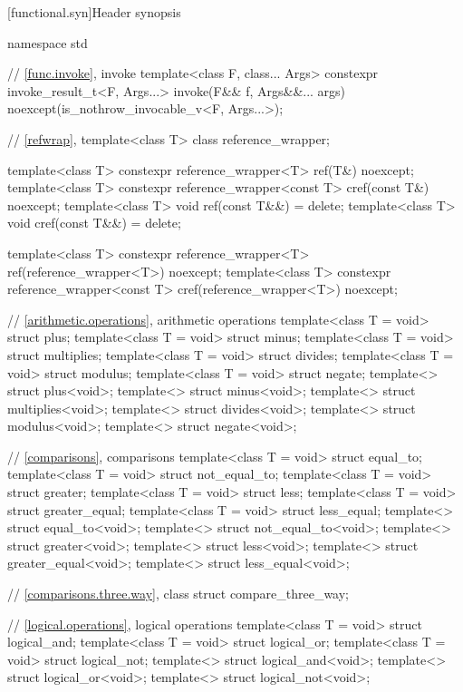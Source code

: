 [functional.syn]{Header  synopsis}

%
%
%
\begin{codeblock}
namespace std {
  // \ref{func.invoke}, invoke
  template<class F, class... Args>
    constexpr invoke_result_t<F, Args...> invoke(F&& f, Args&&... args)
      noexcept(is_nothrow_invocable_v<F, Args...>);

  // \ref{refwrap}, 
  template<class T> class reference_wrapper;

  template<class T> constexpr reference_wrapper<T> ref(T&) noexcept;
  template<class T> constexpr reference_wrapper<const T> cref(const T&) noexcept;
  template<class T> void ref(const T&&) = delete;
  template<class T> void cref(const T&&) = delete;

  template<class T> constexpr reference_wrapper<T> ref(reference_wrapper<T>) noexcept;
  template<class T> constexpr reference_wrapper<const T> cref(reference_wrapper<T>) noexcept;

  // \ref{arithmetic.operations}, arithmetic operations
  template<class T = void> struct plus;
  template<class T = void> struct minus;
  template<class T = void> struct multiplies;
  template<class T = void> struct divides;
  template<class T = void> struct modulus;
  template<class T = void> struct negate;
  template<> struct plus<void>;
  template<> struct minus<void>;
  template<> struct multiplies<void>;
  template<> struct divides<void>;
  template<> struct modulus<void>;
  template<> struct negate<void>;

  // \ref{comparisons}, comparisons
  template<class T = void> struct equal_to;
  template<class T = void> struct not_equal_to;
  template<class T = void> struct greater;
  template<class T = void> struct less;
  template<class T = void> struct greater_equal;
  template<class T = void> struct less_equal;
  template<> struct equal_to<void>;
  template<> struct not_equal_to<void>;
  template<> struct greater<void>;
  template<> struct less<void>;
  template<> struct greater_equal<void>;
  template<> struct less_equal<void>;

  // \ref{comparisons.three.way}, class 
  struct compare_three_way;

  // \ref{logical.operations}, logical operations
  template<class T = void> struct logical_and;
  template<class T = void> struct logical_or;
  template<class T = void> struct logical_not;
  template<> struct logical_and<void>;
  template<> struct logical_or<void>;
  template<> struct logical_not<void>;

}
\end{codeblock}
